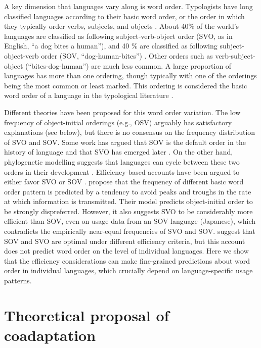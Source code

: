\documentclass[11pt,a4paper]{article}
\begin{document}
A key dimension that languages vary along is word order.
Typologists have long classified languages according to their basic word order, or the order in which they typically order verbs, subjects, and objects \citep{greenberg-universals-1963}.
About 40\% of the world's languages are classified as following subject-verb-object order ({SVO}, as in English, ``a dog bites a human''), and 40 \% are classified as following subject-object-verb order ({SOV}, ``dog-human-bites'') \citep{wals-81}.
Other orders such as verb-subject-object (``bites-dog-human'') are much less common.
A large proportion of languages has more than one ordering, though typically with one of the orderings being the most common or least marked.
This ordering is considered the  basic word order of a language in the typological literature \citep{greenberg-universals-1963, wals-s6}.

Different theories have been proposed for this word order variation.
The low frequency of object-initial orderings (e.g., OSV) arguably has satisfactory explanations (see below), but there is no consensus on the frequency distribution of SVO and SOV.
Some work has argued that SOV is the default order in the history of language and that SVO has emerged later \citep{givon1979understanding, newmeyer2000evolutionary, gibson-noisy-channel-2013}.
On the other hand, phylogenetic modelling suggests that languages can cycle between these two orders in their development \citep{maurits2014tracing}.
Efficiency-based accounts have been argued to either favor SVO or SOV \citep{maurits-why-2010, ferrer-i-cancho-placement-2017}.
\cite{maurits2010why} propose that the frequency of different basic word order pattern is predicted by a tendency to avoid peaks and troughs in the rate at which information is transmitted.
Their model predicts object-initial order to be strongly dispreferred.
However, it also suggests SVO to be considerably more efficient than SOV, even on usage data from an SOV language (Japanese), which contradicts the empirically near-equal frequencies of SVO and SOV.
\cite{ferrer-i-cancho-placement-2017} suggest that SOV and SVO are optimal under different efficiency criteria, but this account does not predict word order on the level of individual languages. 
Here we show that the efficiency considerations can make fine-grained predictions about word order in individual languages, which crucially depend on language-specific usage patterns.

\section*{Theoretical proposal of coadaptation}
\end{document}
